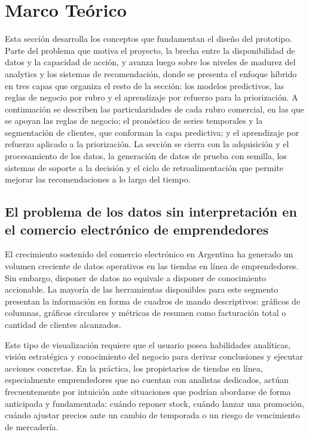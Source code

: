 \section{Marco Teórico}
\label{sec:marco-teorico}

Esta sección desarrolla los conceptos que fundamentan el diseño del prototipo. Parte del problema que motiva el proyecto, la brecha entre la disponibilidad de datos y la capacidad de acción, y avanza luego sobre los niveles de madurez del analytics y los sistemas de recomendación, donde se presenta el enfoque híbrido en tres capas que organiza el resto de la sección: los modelos predictivos, las reglas de negocio por rubro y el aprendizaje por refuerzo para la priorización. A continuación se describen las particularidades de cada rubro comercial, en las que se apoyan las reglas de negocio; el pronóstico de series temporales y la segmentación de clientes, que conforman la capa predictiva; y el aprendizaje por refuerzo aplicado a la priorización. La sección se cierra con la adquisición y el procesamiento de los datos, la generación de datos de prueba con semilla, los sistemas de soporte a la decisión y el ciclo de retroalimentación que permite mejorar las recomendaciones a lo largo del tiempo.

\subsection{El problema de los datos sin interpretación en el comercio electrónico de emprendedores}
\label{sec:problema-datos}

El crecimiento sostenido del comercio electrónico en Argentina ha generado un volumen creciente de datos operativos en las tiendas en línea de emprendedores. Sin embargo, disponer de datos no equivale a disponer de conocimiento accionable. La mayoría de las herramientas disponibles para este segmento presentan la información en forma de cuadros de mando descriptivos: gráficos de columnas, gráficos circulares y métricas de resumen como facturación total o cantidad de clientes alcanzados.

Este tipo de visualización requiere que el usuario posea habilidades analíticas, visión estratégica y conocimiento del negocio para derivar conclusiones y ejecutar acciones concretas. En la práctica, los propietarios de tiendas en línea, especialmente emprendedores que no cuentan con analistas dedicados, actúan frecuentemente por intuición ante situaciones que podrían abordarse de forma anticipada y fundamentada: cuándo reponer stock, cuándo lanzar una promoción, cuándo ajustar precios ante un cambio de temporada o un riesgo de vencimiento de mercadería.


